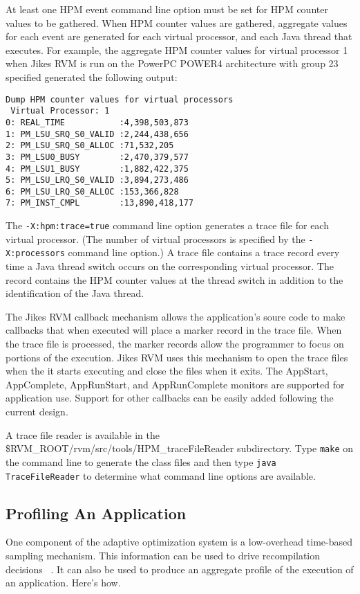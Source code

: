 At least one HPM event command line option must be set for HPM counter values to be gathered.  
When HPM counter values are gathered, aggregate values for each event 
are generated for each virtual processor, and each Java thread that executes.
For example, the aggregate HPM counter values for virtual processor 1
when Jikes RVM is run on the PowerPC POWER4 architecture with group 23 
specified generated the following output:

\begin{verbatim}
Dump HPM counter values for virtual processors
 Virtual Processor: 1
0: REAL_TIME           :4,398,503,873
1: PM_LSU_SRQ_S0_VALID :2,244,438,656
2: PM_LSU_SRQ_S0_ALLOC :71,532,205
3: PM_LSU0_BUSY        :2,470,379,577
4: PM_LSU1_BUSY        :1,882,422,375
5: PM_LSU_LRQ_S0_VALID :3,894,273,486
6: PM_LSU_LRQ_S0_ALLOC :153,366,828
7: PM_INST_CMPL        :13,890,418,177
\end{verbatim}

The {\tt -X:hpm:trace=true} command line option generates a trace file for each 
virtual processor. 
(The number of virtual processors is specified by the {\tt -X:processors} command line option.)
A trace file contains a trace record every time a Java thread switch occurs on the 
corresponding virtual processor.
The record contains the HPM counter values at the thread switch in addition to 
the identification of the Java thread.

The Jikes RVM callback mechanism allows the application's soure code 
to make callbacks that when executed will place a marker record in the trace file.
When the trace file is processed, the marker records allow the
programmer to focus on portions of the execution.
Jikes RVM uses this mechanism to open the trace files
when the it starts executing and close the files when it exits.
The AppStart, AppComplete, AppRunStart, and AppRunComplete monitors
are supported for application use.  
Support for other callbacks can be easily added following the current design.

A trace file reader is available in the \$RVM\_ROOT/rvm/src/tools/HPM\_traceFileReader
subdirectory.  Type {\tt make} on the command line to generate the class files and then 
type {\tt java TraceFileReader} to determine what command line options are available.


\subsection{Profiling An Application}
One component of the adaptive optimization system is a low-overhead
time-based sampling mechanism.  This information can be used to drive
recompilation decisions
\T~\cite{jalapeno-adaptive-00}.
It can also be used to produce an aggregate
profile of the execution of an application.  
Here's how.


